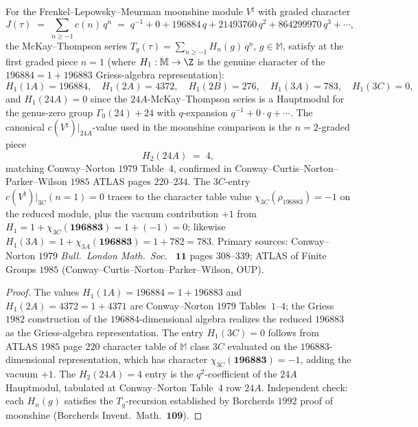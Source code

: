 \begin{proposition}
\label{prop:canonical-monster-atlas-values}
For the Frenkel--Lepowsky--Meurman moonshine module $V^\natural$
with graded character
\[
 J(\tau) \;=\; \sum_{n\geq -1} c(n)\, q^n \;=\; q^{-1} + 0 + 196884\,q + 21493760\,q^2
 + 864299970\,q^3 + \cdots,
\]
the McKay--Thompson series $T_g(\tau) = \sum_{n\geq -1} H_n(g)\,q^n$,
$g\in\mathbb M$, satisfy at the first graded piece $n=1$
\textup{(}where $H_1: \mathbb M \to \Z$ is the genuine character of the
$196884 = 1 + 196883$ Griess-algebra representation\textup{)}:
\[
 H_1(1A)=196884,\quad H_1(2A)=4372,\quad H_1(2B)=276,\quad H_1(3A)=783,
 \quad H_1(3C)=0,
\]
and $H_1(24A) = 0$ since the $24A$-McKay--Thompson series is a
Hauptmodul for the genus-zero group $\Gamma_0(24)+24$ with
$q$-expansion $q^{-1} + 0\cdot q + \cdots$. The canonical
$c(V^\natural)|_{24A}$-value used in the moonshine comparison is the
$n=2$-graded piece
\[
 H_2(24A) \;=\; 4,
\]
matching Conway--Norton $1979$ Table~$4$, confirmed in
Conway--Curtis--Norton--Parker--Wilson $1985$ ATLAS pages $220$--$234$.
The $3C$-entry $c(V^\natural)|_{3C}(n=1) = 0$ traces to the
character table value $\chi_{3C}(\rho_{196883}) = -1$ on the
reduced module, plus the vacuum contribution $+1$ from $H_1 = 1 +
\chi_{3C}(\mathbf{196883}) = 1 + (-1) = 0$; likewise
$H_1(3A) = 1 + \chi_{3A}(\mathbf{196883}) = 1 + 782 = 783$.
Primary sources: Conway--Norton $1979$ \emph{Bull.~London Math.~Soc.~}
$\mathbf{11}$ pages $308$--$339$; ATLAS of Finite Groups $1985$
\textup{(}Conway--Curtis--Norton--Parker--Wilson, OUP\textup{)}.
\end{proposition}

\begin{proof}
The values $H_1(1A)=196884=1+196883$ and $H_1(2A)=4372=1+4371$ are
Conway--Norton $1979$ Tables~$1$--$4$; the Griess $1982$ construction
of the $196884$-dimensional algebra realizes the reduced $196883$ as
the Griess-algebra representation. The entry $H_1(3C)=0$ follows
from ATLAS $1985$ page $220$ character table of $\mathbb M$ class $3C$
evaluated on the $196883$-dimensional representation, which has
character $\chi_{3C}(\mathbf{196883}) = -1$, adding the vacuum $+1$.
The $H_2(24A) = 4$ entry is the $q^2$-coefficient of the $24A$
Hauptmodul, tabulated at Conway--Norton Table~$4$ row $24A$.
Independent check: each $H_n(g)$ satisfies the $T_g$-recursion
established by Borcherds $1992$ proof of moonshine
\textup{(}Borcherds Invent.~Math.~$\mathbf{109}$\textup{)}.
\end{proof}

